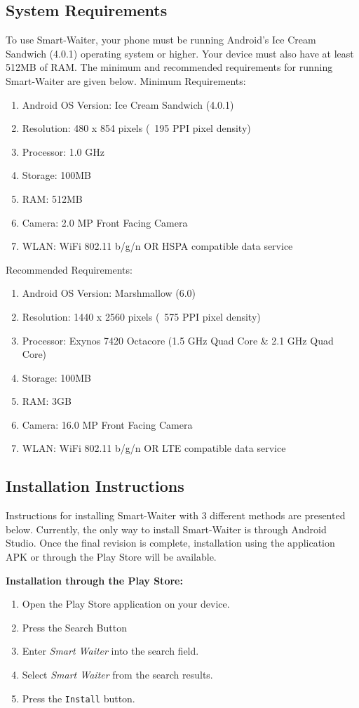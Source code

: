 \documentclass[12pt, titlepage]{article}
\begin{document}
\subsection{System Requirements}
To use Smart-Waiter, your phone must be running Android's Ice Cream Sandwich (4.0.1) operating system or higher. Your device must also have at least 512MB of RAM. The minimum and recommended requirements for running Smart-Waiter are given below.
Minimum Requirements:
\begin{enumerate}
	\item Android OS Version: Ice Cream Sandwich (4.0.1)
	\item Resolution: 480 x 854 pixels (~195 PPI pixel density)
	\item Processor: 1.0 GHz
	\item Storage: 100MB
	\item RAM: 512MB
	\item Camera: 2.0 MP Front Facing Camera
	\item WLAN: WiFi 802.11 b/g/n OR HSPA compatible data service
\end{enumerate}

Recommended Requirements:
\begin{enumerate}
\item Android OS Version: Marshmallow (6.0)
	\item Resolution: 1440 x 2560 pixels (~575 PPI pixel density)
	\item Processor: Exynos 7420 Octacore (1.5 GHz Quad Core \& 2.1 GHz Quad Core)
	\item Storage: 100MB
	\item RAM: 3GB
	\item Camera: 16.0 MP Front Facing Camera
	\item WLAN: WiFi 802.11 b/g/n OR LTE compatible data service	
\end{enumerate}

\subsection{Installation Instructions}
Instructions for installing Smart-Waiter with 3 different methods are presented below. Currently, the only way to install Smart-Waiter is through Android Studio. Once the final revision is complete, installation using the application APK or through the Play Store will be available.

\textbf{\newline Installation through the Play Store:}
	\begin{enumerate}
		\item Open the Play Store application on your device.
		\item Press the Search Button
		\item Enter \emph{Smart Waiter} into the search field.
		\item Select \emph{Smart Waiter} from the search results.
		\item Press the \texttt{Install} button.		
	\end{enumerate}
\end{document}

